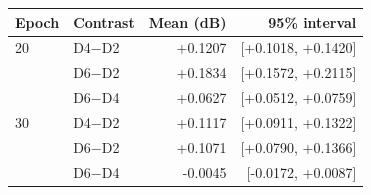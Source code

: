 \begin{tabular}{llrr}
\toprule
Epoch & Contrast & Mean (dB) & 95\% interval \\
\midrule
20 & D4$-$D2 & +0.1207 & [+0.1018, +0.1420] \\
 & D6$-$D2 & +0.1834 & [+0.1572, +0.2115] \\
 & D6$-$D4 & +0.0627 & [+0.0512, +0.0759] \\
\midrule
30 & D4$-$D2 & +0.1117 & [+0.0911, +0.1322] \\
 & D6$-$D2 & +0.1071 & [+0.0790, +0.1366] \\
 & D6$-$D4 & -0.0045 & [-0.0172, +0.0087] \\
\bottomrule
\end{tabular}
